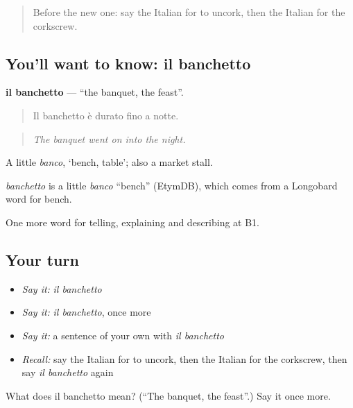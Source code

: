 \label{lesson:IT-C317-banchetto}



\begin{quote}
Before the new one: say the Italian for to uncork, then the Italian for the corkscrew.
\end{quote}

\subsection*{You'll want to know: il banchetto}
\textbf{il banchetto} — \textquotedblleft{}the banquet, the feast\textquotedblright{}.

\begin{quote}
Il banchetto è durato fino a notte.
\end{quote}

\begin{quote}
\emph{The banquet went on into the night.}
\end{quote}

A little \emph{banco}, ‘bench, table’; also a market stall.

\begin{cousinweb}
\emph{banchetto} is a little \emph{banco} \textquotedblleft{}bench\textquotedblright{} (EtymDB), which comes from a Longobard word for bench.
\end{cousinweb}

\begin{grammarlens}[title={What you've built}]
One more word for telling, explaining and describing at B1.
\end{grammarlens}

\subsection*{Your turn}
\begin{itemize}
\raggedright
  \item \emph{Say it:} \emph{il banchetto}
  \item \emph{Say it:} \emph{il banchetto}, once more
  \item \emph{Say it:} a sentence of your own with \emph{il banchetto}
  \item \emph{Recall:} say the Italian for to uncork, then the Italian for the corkscrew, then say \emph{il banchetto} again
\end{itemize}

\begin{tcolorbox}[breakable,colback=teal!4,colframe=teal!35!black,title={Before you move on}]
What does il banchetto mean? (\textquotedblleft{}The banquet, the feast\textquotedblright{}.) Say it once more.
\end{tcolorbox}
